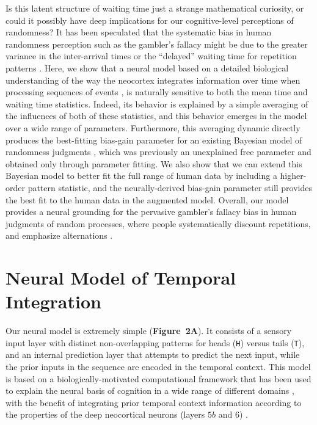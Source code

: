 \documentclass{pnastwo}
\begin{document}
\begin{article}
Is this latent structure of waiting time just a strange mathematical curiosity, or could it possibly have deep implications for our cognitive-level perceptions of randomness?
It has been speculated that the systematic bias in human randomness perception such as the gambler's fallacy might be due to the greater variance in the inter-arrival times or the ``delayed'' waiting time for repetition patterns \cite{Sun2010jdm,Sun2010cogpsy}.
Here, we show that a neural model based on a detailed biological understanding of the way the neocortex integrates information over time when processing sequences of events \cite{OReilly2012wiki,OReilly2014TI}, is naturally sensitive to both the mean time and waiting time statistics.
Indeed, its behavior is explained by a simple averaging of the influences of both of these statistics, and this behavior emerges in the model over a wide range of parameters.
Furthermore, this averaging dynamic directly produces the best-fitting bias-gain parameter for an existing Bayesian model of randomness judgments \cite{Griffiths2001}, which was previously an unexplained free parameter and obtained only through parameter fitting.
We also show that we can extend this Bayesian model to better fit the full range of human data by including a higher-order pattern statistic, and the neurally-derived bias-gain parameter still provides the best fit to the human data in the augmented model.
Overall, our model provides a neural grounding for the pervasive gambler's fallacy bias in human judgments of random processes, where people systematically discount repetitions, and emphasize alternations \cite{Falk1997,Nickerson2002}.



\section{Neural Model of Temporal Integration}
Our neural model is extremely simple (\textbf{Figure~2A}).
It consists of a sensory input layer with distinct non-overlapping patterns for heads (\texttt{H}) versus tails (\texttt{T}),
and an internal prediction layer that attempts to predict the next input, while the prior inputs in the sequence are encoded in the temporal context.
This model is based on a biologically-motivated computational framework that has been used to explain the neural basis of cognition in a wide range of different domains \cite{OReilly2012wiki},
with the benefit of integrating prior temporal context information according to the properties of the deep neocortical neurons (layers $5b$ and $6$) \cite{OReilly2014TI}.


\end{article}
\end{document}
